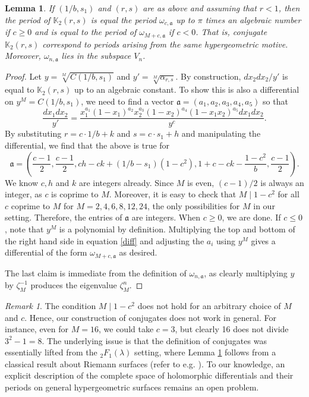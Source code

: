 \documentclass[12pt]{amsart}
\newtheorem{Lemma}[theorem]{Lemma}
\theoremstyle{definition}
\theoremstyle{remark}
\newtheorem{remark}{Remark}
\begin{document}
\begin{Lemma}\label{geom}
    If $(1/b,s_1)$ and $(r,s)$ are as above and assuming that $r<1$, then the period of $\mathbb{K}_2(r,s)$ is equal the period $\omega_{c,\mathfrak{a}}$ up to $\pi$ times an algebraic number if $c\geq 0$ and is equal to the period of $\omega_{M+c,\mathfrak{a}}$ if $c<0$. That is, conjugate $\mathbb{K}_2(r,s)$ correspond to periods arising from the same hypergeometric motive. Moreover, $\omega_{n,\mathfrak{a}}$ lies in the subspace $V_n$.
\end{Lemma}
\begin{proof}
    Let $y=\sqrt[M]{C(1/b,s_1)}$ and $y'=\sqrt[M]{\alpha_{r,s}}$. By construction, $dx_2dx_2/y'$ is equal to $\mathbb{K}_2(r,s)$ up to an algebraic constant.  To show this is also a differential on $y^M=C(1/b,s_1)$, we need to find a vector $\mathfrak{a}=(a_1,a_2,a_3,a_4,a_5)$ so that \begin{equation}\label{diff}
        \frac{dx_1dx_2}{y'}=\frac{x_1^{a_1}(1-x_1)^{a_2}x_2^{a_3}(1-x_2)^{a_4}(1-x_1x_2)^{a_5}dx_1dx_2}{y^c}. 
    \end{equation}By substituting $r=c\cdot 1/b+k$ and $s=c\cdot s_1+h$ and manipulating the differential, we find that the above is true for $$\mathfrak{a}=\left(\frac{c-1}{2},\frac{c-1}{2},c h - c k + (1/b - s_1) (1 - c^2),1 + c - c k - \frac{1-c^2}{b} ,\frac{c-1}{2}\right).$$ We know $c,h$ and $k$ are integers already. Since $M$ is even, $(c-1)/2$ is always an integer, as $c$ is coprime to $M$. Moreover, it is easy to check that $M\mid 1-c^2$ for all $c$ coprime to $M$ for $M=2,4,6,8,12,24$, the only possibilities for $M$ in our setting. Therefore, the entries of $\mathfrak{a}$ are integers. When $c\geq 0$, we are done. If $c\leq 0$, note that $y^M$ is a polynomial by definition. Multiplying the top and bottom of the right hand side in equation \eqref{diff} and adjusting the $a_i$ using $y^M$ gives a differential of the form $\omega_{M+c,\mathfrak{a}}$ as desired.

    The last claim is immediate from the definition of $\omega_{n,\mathfrak{a}}$, as clearly multiplying $y$ by $\zeta_M^{-1}$ produces the eigenvalue $\zeta_M^n$.
\end{proof}

\begin{remark}
    The condition $M\mid 1-c^2$ does not hold for an arbitrary choice of $M$ and $c$. Hence, our construction of conjugates does not work in general. For instance, even for $M=16$, we could take $c=3$, but clearly 16 does not divide $3^2-1=8$. The underlying issue is that the definition of conjugates was essentially lifted from the ${}_2F_1(\lambda)$ setting, where Lemma \ref{geom} follows from a classical result about Riemann surfaces (refer to e.g. \cite{archinard}). To our knowledge, an explicit description of the complete space of holomorphic differentials and their periods on general hypergeometric surfaces remains an open problem.
\end{remark}
\end{document}
